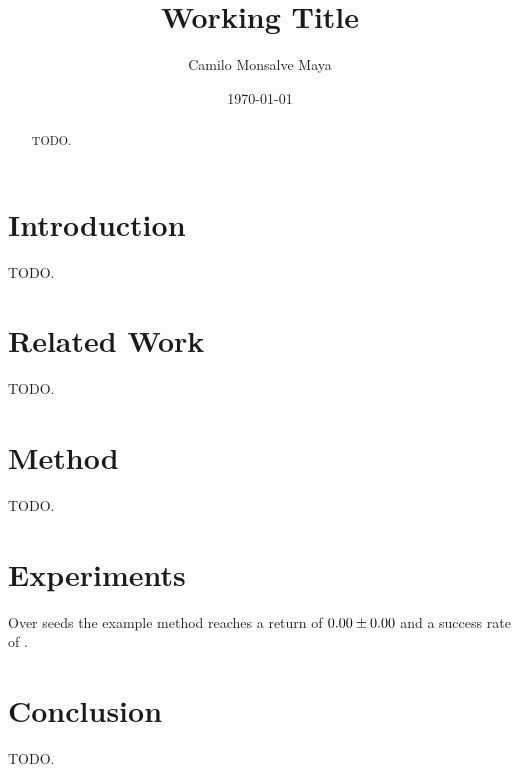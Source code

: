 \documentclass[11pt]{article}
\title{Working Title}
\author{Camilo Monsalve Maya}
\date{\today}
\begin{document}
\maketitle

\begin{abstract}
TODO.
\end{abstract}

\section{Introduction}
TODO.

\section{Related Work}
TODO.

\section{Method}
TODO.

\section{Experiments}
Over \resExampleNSeeds{} seeds the example method reaches a return of
$0.00 \pm 0.00$ and a success rate of \resExampleSuccessRate.

\section{Conclusion}
TODO.



\end{document}
